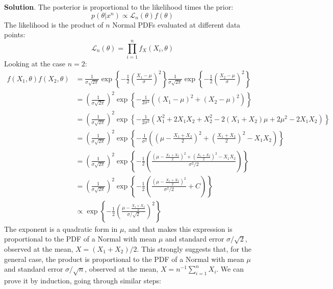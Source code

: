 \textbf{Solution}.
The posterior is proportional to the likelihood times the prior:
\[
p(\theta | x^{n}) \propto \mathcal{L}_{n}(\theta) f(\theta)
\]
The likelihood is the product of \(n\) Normal PDFs evaluated at
different data points:
\[
\mathcal{L}_{n}(\theta) = \prod_{i=1}^{n} f_X(X_{i}, \theta)
\]
Looking at the case \(n = 2\):
\begin{align*} 
f(X_{1}, \theta) f(X_{2}, \theta) &= 
\frac{1}{\sigma \sqrt{2 \pi}} \exp \left\{-\frac{1}{2} \left(\frac{X_{1} - \mu}{\sigma} \right)^{2} \right\}
\frac{1}{\sigma \sqrt{2 \pi}} \exp \left\{-\frac{1}{2} \left(\frac{X_{2} - \mu}{\sigma} \right)^{2} \right\} \\
&= \left( \frac{1}{\sigma \sqrt{2 \pi}} \right)^{2} \exp \left\{-\frac{1}{2\sigma^{2}} \left((X_{1} - \mu)^{2} + (X_{2} - \mu)^{2} \right) \right\} \\
&= \left( \frac{1}{\sigma \sqrt{2 \pi}} \right)^{2} \exp \left\{-\frac{1}{2\sigma^{2}} \left(
X_{1}^{2} + 2 X_{1} X_{2} + X_{2}^{2} - 2 (X_{1} + X_{2})\mu + 2\mu^{2} - 2 X_{1} X_{2}
\right) \right\} \\
&= \left( \frac{1}{\sigma \sqrt{2 \pi}} \right)^{2} \exp \left\{-\frac{1}{\sigma^{2}}\left(
\left(\mu - \frac{X_{1} + X_{2}}{2}\right)^{2} + \left(\frac{X_{1} + X_{2}}{2}\right)^{2} - X_{1} X_{2}
\right) \right\} \\
&= \left( \frac{1}{\sigma \sqrt{2 \pi}} \right)^{2} \exp \left\{-\frac{1}{2} \left(
\frac{\left(\mu - \frac{X_{1} + X_{2}}{2}\right)^{2} + \left(\frac{X_{1} + X_{2}}{2}\right)^{2} - X_{1} X_{2}}{\sigma^{2} / 2}
\right) \right\} \\
&= \left( \frac{1}{\sigma \sqrt{2 \pi}} \right)^{2} \exp \left\{-\frac{1}{2} \left(
\frac{\left(\mu - \frac{X_{1} + X_{2}}{2}\right)^{2}}{\sigma^{2} / 2} + C
\right) \right\} \\
&\propto \exp \left\{-\frac{1}{2}
\left(\frac{\mu - \frac{X_{1} + X_{2}}{2}}{\sigma / \sqrt{2}}\right)^{2}
\right\}
\end{align*}
The exponent is a quadratic form in \(\mu\), and that makes this
expression is proportional to the PDF of a Normal with mean \(\mu\) and
standard error \(\sigma / \sqrt{2}\), observed at the mean,
\(X = (X_{1} + X_{2})/2\).
This strongly suggests that, for the general case, the product is
proportional to the PDF of a Normal with mean \(\mu\) and standard error
\(\sigma / \sqrt{n}\), observed at the mean,
\(X = n^{-1} \sum_{i=1}^{n} X_{i}\). We can prove it by induction, going
through similar steps:
